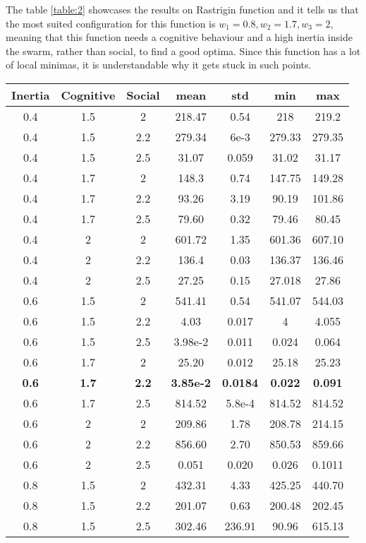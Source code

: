 \documentclass{article}
\begin{document}
The table \ref{table:2} showcases the results on Rastrigin function and it tells us that the most suited configuration for this function is $w_1 = 0.8, w_2 = 1.7, w_3 = 2$, meaning that this function needs a cognitive behaviour and a high inertia inside the swarm, rather than social, to find a good optima. Since this function has a lot of local minimas, it is understandable why it gets stuck in such points.


\begin{table}[h!]
\centering
\begin{tabular}{ |c|c|c|c|c|c|c| } 
\hline
Inertia & Cognitive & Social & mean & std & min & max\\
\hline
0.4 & 1.5 & 2 & 218.47 & 0.54 & 218 & 219.2\\ 
0.4 & 1.5 & 2.2 & 279.34 & 6e-3 & 279.33 & 279.35\\ 
0.4 & 1.5 & 2.5 & 31.07 & 0.059 & 31.02 & 31.17\\ 
0.4 & 1.7 & 2 & 148.3 & 0.74 & 147.75 & 149.28\\
0.4 & 1.7 & 2.2 & 93.26 & 3.19 & 90.19 & 101.86\\
0.4 & 1.7 & 2.5 & 79.60 & 0.32 & 79.46 & 80.45\\
0.4 & 2 & 2 & 601.72 & 1.35 & 601.36 & 607.10\\
0.4 & 2 & 2.2 & 136.4 & 0.03 & 136.37 & 136.46\\
0.4 & 2 & 2.5 & 27.25 & 0.15 & 27.018 & 27.86\\
0.6 & 1.5 & 2 & 541.41 & 0.54 & 541.07 & 544.03\\
0.6 & 1.5 & 2.2 & 4.03 & 0.017 & 4 & 4.055\\ 
0.6 & 1.5 & 2.5 & 3.98e-2 & 0.011 & 0.024 & 0.064\\ 
0.6 & 1.7 & 2 & 25.20 & 0.012 & 25.18 & 25.23\\
\textbf{0.6} & \textbf{1.7} & \textbf{2.2} & \textbf{3.85e-2} & \textbf{0.0184} & \textbf{0.022} & \textbf{0.091}\\
0.6 & 1.7 & 2.5 & 814.52 & 5.8e-4 & 814.52 & 814.52\\
0.6 & 2 & 2 & 209.86 & 1.78 & 208.78 & 214.15\\
0.6 & 2 & 2.2 & 856.60 & 2.70 & 850.53 & 859.66\\
0.6 & 2 & 2.5 & 0.051 & 0.020 & 0.026 & 0.1011\\
0.8 & 1.5 & 2 & 432.31 & 4.33 & 425.25 & 440.70\\
0.8 & 1.5 & 2.2 & 201.07 & 0.63 & 200.48 & 202.45\\ 
0.8 & 1.5 & 2.5 & 302.46 &236.91 & 90.96 & 615.13 \\ 

\end{tabular}
\end{table}
\end{document}
